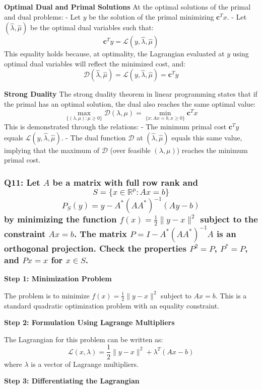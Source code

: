 \documentclass[8pt]{article}
\begin{document}
\textbf{Optimal Dual and Primal Solutions}
At the optimal solutions of the primal and dual problems:
- Let \(y\) be the solution of the primal minimizing \(\mathbf{c}^T x\).
- Let \((\hat{\lambda}, \hat{\mu})\) be the optimal dual variables such that:
  \[
  \mathbf{c}^T y = \mathcal{L}(y, \hat{\lambda}, \hat{\mu})
  \]
  This equality holds because, at optimality, the Lagrangian evaluated at \(y\) using optimal dual variables will reflect the minimized cost, and:
  \[
  \mathcal{D}(\hat{\lambda}, \hat{\mu}) = \mathcal{L}(y, \hat{\lambda}, \hat{\mu}) = \mathbf{c}^T y
  \]

\textbf{Strong Duality}
The strong duality theorem in linear programming states that if the primal has an optimal solution, the dual also reaches the same optimal value:
\[
\max_{\{(\lambda, \mu) : \mu \geq 0\}} \mathcal{D}(\lambda, \mu) = \min_{\{x : A x = b, x \geq 0\}} \mathbf{c}^T x
\]
This is demonstrated through the relations:
- The minimum primal cost \(\mathbf{c}^T y\) equals \(\mathcal{L}(y, \hat{\lambda}, \hat{\mu})\).
- The dual function \(\mathcal{D}\) at \((\hat{\lambda}, \hat{\mu})\) equals this same value, implying that the maximum of \(\mathcal{D}\) (over feasible \((\lambda, \mu)\)) reaches the minimum primal cost.


\subsubsection*{Q11: Let \(A\) be a matrix with full row rank and
\[ S = \{x \in \mathbb{R}^p : Ax = b\} \]
\[ P_S(y) = y - A^* (AA^*)^{-1} (Ay - b) \]
by minimizing the function \(f(x) = \frac{1}{2} \|y - x\|^2\) subject to the constraint \(Ax = b\). The matrix \(P = I - A^* (AA^*)^{-1} A\) is an orthogonal projection. Check the properties \(P^2 = P\), \(P^* = P\), and \(Px = x\) for \(x \in S\).}

\textbf{Step 1: Minimization Problem}

The problem is to minimize \(f(x) = \frac{1}{2} \|y - x\|^2\) subject to \(Ax = b\). This is a standard quadratic optimization problem with an equality constraint.

\textbf{Step 2: Formulation Using Lagrange Multipliers}

The Lagrangian for this problem can be written as:
\[
\mathcal{L}(x, \lambda) = \frac{1}{2} \|y - x\|^2 + \lambda^T (Ax - b)
\]
where \(\lambda\) is a vector of Lagrange multipliers. 

\textbf{Step 3: Differentiating the Lagrangian}
\end{document}
